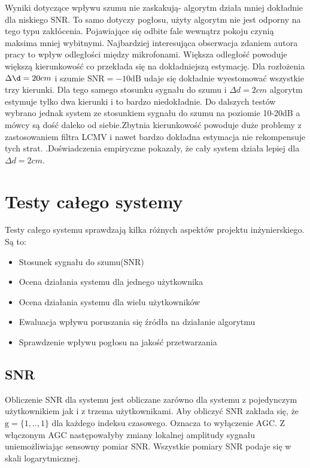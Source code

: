 \noindent Wyniki dotyczące wpływu szumu nie zaskakują- algorytm działa mniej dokładnie dla niskiego SNR. To samo dotyczy pogłosu, użyty algorytm nie jest odporny na tego typu zakłócenia. Pojawiające się odbite fale wewnątrz pokoju czynią maksima mniej wybitnymi. Najbardziej interesująca obserwacja zdaniem autora pracy to wpływ odległości między mikrofonami. Większa odległość powoduje większą kierunkowość co przekłada się na dokładniejszą estymację. Dla rozłożenia $\Delta \d = 20cm$ i szumie $\mathrm{SNR}=-10\mathrm{dB}$ udaje się dokładnie wyestomować wszystkie trzy kierunki. Dla tego samego stosunku sygnału do szumu i $\Delta d = 2cm$ algorytm estymuje tylko dwa kierunki i to bardzo niedokładnie. Do dalszych testów wybrano jednak system ze stosunkiem sygnału do szumu na poziomie 10-20dB a mówcy są dość daleko od siebie.Zbytnia kierunkowość powoduje duże problemy z zastosowaniem filtra LCMV i nawet bardzo dokładna estymacja nie rekompensuje tych strat. .Doświadczenia empiryczne pokazały, że cały system działa lepiej dla $\Delta d = 2cm$.

\newpage

\section{Testy całego systemy}

Testy całego systemu sprawdzają kilka różnych aspektów projektu inżynierskiego. Są to:

\begin{itemize}
    \item Stosunek sygnału do szumu(SNR)
    \item Ocena działania systemu dla jednego użytkownika
    \item Ocena działania systemu dla wielu użytkowników
    \item Ewaluacja wpływu poruszania się źródła na działanie algorytmu
    \item Sprawdzenie wpływu pogłosu na jakość przetwarzania
    
\end{itemize}
\subsection{SNR}

Obliczenie SNR dla systemu jest obliczane zarówno dla systemu z pojedynczym użytkownikiem jak i z trzema użytkownikami. Aby obliczyć SNR zakłada się, że $\bm{\mathrm{g}} = \{1,..,1\}$ dla każdego indeksu czasowego. Oznacza to wyłączenie AGC. Z włączonym AGC następowałyby zmiany lokalnej amplitudy sygnału uniemożliwiając sensowny pomiar SNR. Wszystkie pomiary SNR podaje się w skali logarytmicznej.

